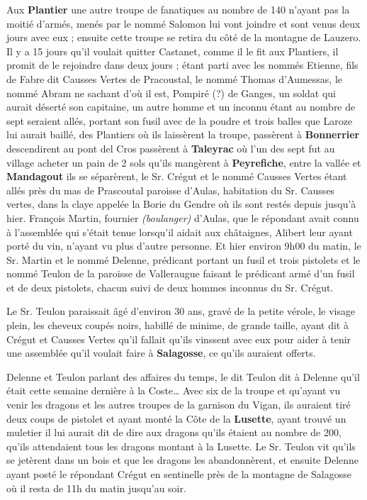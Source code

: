 Aux \textbf{Plantier} une autre troupe de fanatiques au nombre de 140 n’ayant pas la moitié d’armés, menés par le nommé Salomon lui vont joindre et sont venus deux jours avec eux ; ensuite cette troupe se retira du côté de la montagne de Lauzero. Il y a 15 jours qu’il voulait quitter Castanet, comme il le fit aux Plantiers, il promit de le rejoindre dans deux jours ; étant parti avec les nommés Etienne, fils de Fabre dit Causses Vertes de Pracoustal, le nommé Thomas d’Aumessas, le nommé Abram ne sachant d’où il est, Pompiré (?) de Ganges, un soldat qui aurait déserté son capitaine, un autre homme et un inconnu étant au nombre de sept seraient allés, portant son fusil avec de la poudre et trois balles que Laroze lui aurait baillé, des Plantiers où ils laissèrent la troupe, passèrent à \textbf{Bonnerrier} descendirent au pont del Cros passèrent à \textbf{Taleyrac} où l’un des sept fut au village acheter un pain de 2 sols qu’ils mangèrent à \textbf{Peyrefiche}, entre la vallée et \textbf{Mandagout} ils se séparèrent, le Sr. Crégut et le nommé Causses Vertes étant allés près du mas de Prascoutal paroisse d’Aulas, habitation du Sr. Causses vertes, dans la claye appelée la Borie du Gendre où ils sont restés depuis jusqu’à hier. François Martin, fournier \textit{(boulanger)} d’Aulas, que le répondant avait connu à l’assemblée qui s’était tenue lorsqu’il aidait aux châtaignes, Alibert leur ayant porté du vin, n’ayant vu plus d’autre personne. Et hier environ 9h00 du matin, le Sr. Martin et le nommé Delenne, prédicant portant un fusil et trois pistolets et le nommé Teulon de la paroisse de Valleraugue faisant le prédicant armé d’un fusil et de deux pistolets, chacun suivi de deux hommes inconnus du Sr. Crégut.

Le Sr. Teulon paraissait âgé d’environ 30 ans, gravé de la petite vérole, le visage plein, les cheveux coupés noirs, habillé de minime, de grande taille, ayant dit à Crégut et Causses Vertes qu’il fallait qu’ils vinssent avec eux pour aider à tenir une assemblée qu’il voulait faire à \textbf{Salagosse}, ce qu’ils auraient offerts.

Delenne et Teulon parlant des affaires du temps, le dit Teulon dit à Delenne qu’il était cette semaine dernière à la Coste… Avec six de la troupe et qu’ayant vu venir les dragons et les autres troupes de la garnison du Vigan, ils auraient tiré deux coups de pistolet et ayant monté la Côte de la \textbf{Lusette}, ayant trouvé un muletier il lui aurait dit de dire aux dragons qu’ils étaient au nombre de 200, qu’ils attendaient tous les dragons montant à la Lusette. Le Sr. Teulon vit qu’ils se jetèrent dans un bois et que les dragons les abandonnèrent, et ensuite Delenne ayant posté le répondant Crégut en sentinelle près de la montagne de Salagosse où il resta de 11h du matin jusqu’au soir.

